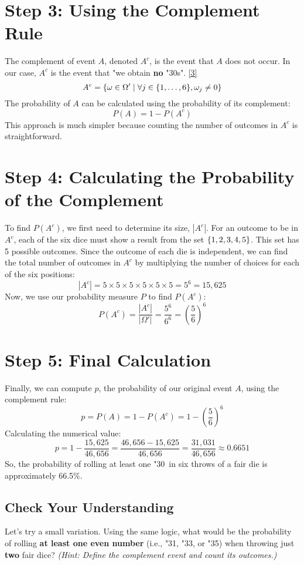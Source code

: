 \documentclass[11pt,a4paper]{article}
\providecommand{\dicei}{\wasyfamily\char"30}
\providecommand{\diceii}{\wasyfamily\char"31}
\providecommand{\diceiii}{\wasyfamily\char"32}
\providecommand{\diceiv}{\wasyfamily\char"33}
\providecommand{\dicev}{\wasyfamily\char"34}
\providecommand{\dicevi}{\wasyfamily\char"35}
\begin{document}
\section{Step 3: Using the Complement Rule}
The complement of event $A$, denoted $A^c$, is the event that $A$ does not occur. In our case, $A^c$ is the event that "we obtain \textbf{no} \dicei s". \hyperlink{note:complement}{[3]}
\[
A^c = \{ \omega \in \Omega' \mid \forall j \in \{1, \dots, 6\}, \omega_j \neq \dicei \}
\]
The probability of $A$ can be calculated using the probability of its complement:
\[
P(A) = 1 - P(A^c)
\]
This approach is much simpler because counting the number of outcomes in $A^c$ is straightforward.

\section{Step 4: Calculating the Probability of the Complement}

To find $P(A^c)$, we first need to determine its size, $|A^c|$. For an outcome to be in $A^c$, each of the six dice must show a result from the set $\{\diceii, \diceiii, \diceiv, \dicev, \dicevi\}$. This set has 5 possible outcomes.
Since the outcome of each die is independent, we can find the total number of outcomes in $A^c$ by multiplying the number of choices for each of the six positions:
\[
|A^c| = 5 \times 5 \times 5 \times 5 \times 5 \times 5 = 5^6 = 15,625
\]
Now, we use our probability measure $P$ to find $P(A^c)$:
\[
P(A^c) = \frac{|A^c|}{|\Omega'|} = \frac{5^6}{6^6} = \left(\frac{5}{6}\right)^6
\]

\section{Step 5: Final Calculation}

Finally, we can compute $p$, the probability of our original event $A$, using the complement rule:
\[
p = P(A) = 1 - P(A^c) = 1 - \left(\frac{5}{6}\right)^6
\]
Calculating the numerical value:
\[
p = 1 - \frac{15,625}{46,656} = \frac{46,656 - 15,625}{46,656} = \frac{31,031}{46,656} \approx 0.6651
\]
So, the probability of rolling at least one \dicei\ in six throws of a fair die is approximately 66.5\%.

\subsection*{Check Your Understanding}
Let's try a small variation. Using the same logic, what would be the probability of rolling \textbf{at least one even number} (i.e., \diceii, \diceiv, or \dicevi) when throwing just \textbf{two} fair dice?
\textit{(Hint: Define the complement event and count its outcomes.)}
\end{document}

